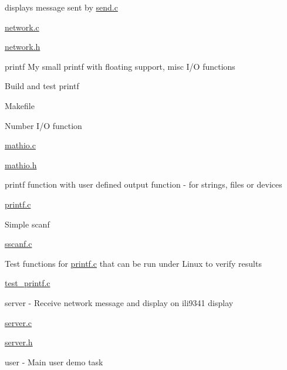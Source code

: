 \begin{DoxyItemize}
\begin{DoxyItemize}
\item displays message sent by \hyperlink{send_8c}{send.\+c}
\begin{DoxyItemize}
\item \hyperlink{network_8c}{network.\+c}
\item \hyperlink{network_8h}{network.\+h}
\end{DoxyItemize}
\end{DoxyItemize}
\item printf My small printf with floating support, misc I/O functions
\begin{DoxyItemize}
\item Build and test printf
\begin{DoxyItemize}
\item Makefile
\end{DoxyItemize}
\item Number I/O function
\begin{DoxyItemize}
\item \hyperlink{mathio_8c}{mathio.\+c}
\item \hyperlink{mathio_8h}{mathio.\+h}
\end{DoxyItemize}
\item printf function with user defined output function -\/ for strings, files or devices
\begin{DoxyItemize}
\item \hyperlink{printf_8c}{printf.\+c}
\end{DoxyItemize}
\item Simple scanf
\begin{DoxyItemize}
\item \hyperlink{sscanf_8c}{sscanf.\+c}
\end{DoxyItemize}
\item Test functions for \hyperlink{printf_8c}{printf.\+c} that can be run under Linux to verify results
\begin{DoxyItemize}
\item \hyperlink{test__printf_8c}{test\+\_\+printf.\+c}
\end{DoxyItemize}
\end{DoxyItemize}
\item server -\/ Receive network message and display on ili9341 display
\begin{DoxyItemize}
\item \hyperlink{server_8c}{server.\+c}
\item \hyperlink{server_8h}{server.\+h}
\end{DoxyItemize}
\item user -\/ Main user demo task

\end{DoxyItemize}
